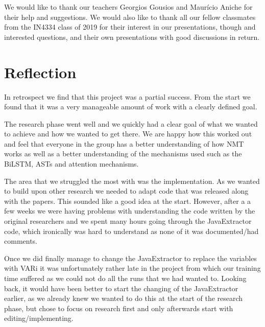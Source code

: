 \documentclass[a4paper,10pt]{article}
\theoremstyle{plain}
\theoremstyle{definition}
\begin{document}
\begin{multicols*}{2}

We would like to thank our teachers Georgios Gousios and Maurício Aniche for their help and suggestions. We would also like to thank all our fellow classmates from the IN4334 class of 2019 for their interest in our presentations, though and interested questions, and their own presentations with good discussions in return.


\section{Reflection}
\label{reflection}
In retrospect we find that this project was a partial success. From the start we found that it was a very manageable amount of work with a clearly defined goal.

The research phase went well and we quickly had a clear goal of what we wanted to achieve and how we wanted to get there. We are happy how this worked out and feel that everyone in the group has a better understanding of how NMT works as well as a better understanding of the mechanisms used such as the BiLSTM, ASTs and attention mechanisms. 

The area that we struggled the most with was the implementation. As we wanted to build upon other research we needed to adapt code that was released along with the papers. This sounded like a good idea at the start. However, after a a few weeks we were having problems with understanding the code written by the original researchers and we spent many hours going through the JavaExtractor code, which ironically was hard to understand as none of it was documented/had comments. 

Once we did finally manage to change the JavaExtractor to replace the variables with VARi it was unfortunately rather late in the project from which our training time suffered as we could not do all the runs that we had wanted to. Looking back, it would have been better to start the changing of the JavaExtractor earlier, as we already knew we wanted to do this at the start of the research phase, but chose to focus on research first and only afterwards start with editing/implementing.


\end{multicols*}
\end{document}
